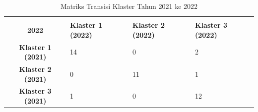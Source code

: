 \begin{table}[H]
\centering
\caption{Matriks Transisi Klaster Tahun 2021 ke 2022} \label{tab:transisi_2021_2022}
\begin{tabular}{|c|p{2cm}|p{2cm}|p{2cm}|}
\hline
\makecell{\textbf{Tahun 2021} \\ \textbf{2022}} & \textbf{Klaster 1 (2022)} & \textbf{Klaster 2 (2022)} & \textbf{Klaster 3 (2022)} \\ \hline
\textbf{Klaster 1 (2021)} & 14 & 0 & 2 \\ \hline
\textbf{Klaster 2 (2021)} & 0 & 11 & 1 \\ \hline
\textbf{Klaster 3 (2021)} & 1 & 0 & 12 \\ \hline
\end{tabular}
\end{table}